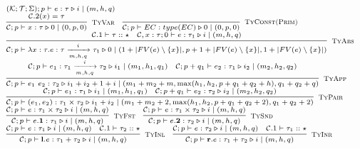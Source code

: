 \documentclass[fleqn]{article}
\begin{document}
\[
\scriptsize
\begin{array}{l}
(\mathcal{K}; \mathcal{T}; \Sigma);p \vdash e : \tau \triangleright i \mid (m, h, q) \\

\infer[\textsc{TyVar}]{\jtygc{\mathcal{C};p}{x}{\tau}{0}{0}{p}{0}}{\mathcal{C}.2(x)=\tau} \hspace{1em}

\infer[\textsc{TyConst(Prim)}]{\jtygc{\mathcal{C};p}{EC}{type(EC)}{0}{0}{p}{0}}{} \\

\infer[\textsc{TyAbs}]{\jtygc{ \mathcal{C};p}{ \lambda x:\tau. e}{ \tau \xrightarrow[m,h,q]{i} \tau_1 }{ 0 }{ 1 + |FV(e)\setminus \{ x \}| }{p + 1 + |FV(e)\setminus\{x\}|}{1 + |FV(e) \setminus \{x\}|} }{\mathcal{C}.1 \vdash \tau :: \star & \jtygc{\mathcal{C},x:\tau; 0}{ e }{ \tau_1 }{ i }{ m }{h}{q}} \\

\infer[\textsc{TyApp}]{\jtygc{\mathcal{C};p} { e_1~e_2 } { \tau_2 } { i_1 + i_2 + 1 + i } { m_1 + m_2 + m }{ \max(h_1,h_2,p+q_1+q_2+h) }{q_1+q_2+q} }{\jtygc{\mathcal{C};p} { e_1 }{ \tau_1 \xrightarrow[m,h,q]{i} \tau_2 }{ i_1 }{ m_1 }{h_1}{q_1} & \jtygc{\mathcal{C};p+q_1 } { e_2 }{ \tau_1 }{ i_2 }{ m_2}{h_2}{q_2}} \\

\infer[\textsc{TyPair}]{\jtygc{\mathcal{C};p}{ (e_1,e_2) }{ \tau_1 \times \tau_2 }{ i_1 + i_2 }{ m_1 + m_2 + 2}{\max(h_1,h_2,p+q_1+q_2+2)}{q_1+q_2+2} }{\jtygc{\mathcal{C};p}{  e_1 }{ \tau_1 }{ i_1 }{m_1}{h_1}{q_1} & \jtygc{\mathcal{C};p+q_1 }{ e_2 }{ \tau_2 }{ i_2 }{ m_2}{h_2}{q_2} } \\

\infer[\textsc{TyFst}]{\jtygc{\mathcal{C};p }{ e.\mathbf{1} }{ \tau_1 }{ i }{ m}{h}{q} }{\jtygc{\mathcal{C};p }{ e }{ \tau_1 \times \tau_2 }{ i }{ m}{h}{q} } \hspace{1em}

\infer[\textsc{TySnd}]{\jtygc{\mathcal{C};p }{ e.\mathbf{2} }{ \tau_2 }{ i }{ m}{h}{q} }{\jtygc{\mathcal{C};p }{ e }{ \tau_1 \times \tau_2 }{ i }{ m}{h}{q} } \\

\infer[\textsc{TyInl}]{\jtygc{\mathcal{C};p }{ \mathbf{l}.e }{ \tau_1 + \tau_2 }{ i }{ m}{h}{q}}{\jtygc{\mathcal{C};p }{ e }{ \tau_1 }{ i }{ m }{h}{q} & \mathcal{C}.1 \vdash \tau_2 :: \star} \hspace{1em}

\infer[\textsc{TyInr}]{\jtygc{\mathcal{C};p }{ \mathbf{r}.e }{ \tau_1 + \tau_2 }{ i }{ m}{h}{q}}{\jtygc{\mathcal{C};p }{ e }{ \tau_2 }{ i }{ m }{h}{q} & \mathcal{C}.1 \vdash \tau_1 :: \star} \\


\end{array}\]
\end{document}

